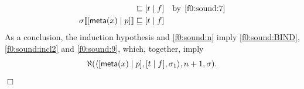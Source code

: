 \begin{enumerate}
\begin{enumerate}
\begin{align}
          &\sqsubseteq [{t}\mid{f}]
          &\text{by} \,\; \eqref{f0:sound:7}\notag\\
            {\sigma}\llbracket{[{\textsf{meta}(x)}\mid{p}]}\rrbracket
          &\sqsubseteq [{t}\mid{f}] \label{f0:sound:9}
        \end{align}
        As a conclusion, the induction hypothesis and
        \eqref{f0:sound:n} imply \eqref{f0:sound:BIND},
        \eqref{f0:sound:incl2} and \eqref{f0:sound:9}, which,
        together, imply
        \[\ind{P}(\match{\cons{t}{f}}%
                        {\cons{\meta{x}}{p}}%
                        {\sigma_1},%
                  n+1, \sigma).\] \hfill \(\Box\)

    \end{enumerate}

\end{enumerate}
